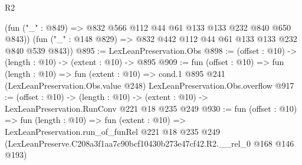 \begin{lexlean}{R2}
\begin{coremodule}
        (fun ("_" : @849) => @832 @566 @112 @44 @61 @133 @133 @232 @840 @650 @843))
      (fun ("_" : @148 @829) => @832 @442 @112 @44 @61 @133 @133 @232 @840 @539 @843))
@895 := LexLeanPreservation.Obs
@898 := (offset : @10) -> (length : @10) -> (extent : @10) -> @895
@909 := fun (offset : @10) =>
  fun (length : @10) =>
  fun (extent : @10) =>
  cond.{1} @895 @241 (LexLeanPreservation.Obs.value @248) LexLeanPreservation.Obs.overflow
@917 := (offset : @10) ->
  (length : @10) -> (extent : @10) -> LexLeanPreservation.RunConv @221 @18 @235 @249
@930 := fun (offset : @10) =>
  fun (length : @10) =>
  fun (extent : @10) =>
  LexLeanPreservation.run_of_funRel
    @221
    @18
    @235
    @249
    (LexLeanPreserve.C208a3f1aa7c90bcf10430b273e47cf42.R2.__rel_0 @168 @146 @193)
\end{coremodule}
\end{lexlean}
